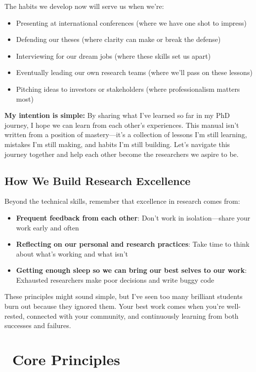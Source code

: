 \documentclass[11pt,a4paper]{article}
\newcommand{\staritem}{\item[\color{goldenyellow}\faStar]}
\begin{document}
The habits we develop now will serve us when we're:
\begin{itemize}
    \staritem Presenting at international conferences (where we have one shot to impress)
    \staritem Defending our theses (where clarity can make or break the defense)
    \staritem Interviewing for our dream jobs (where these skills set us apart)
    \staritem Eventually leading our own research teams (where we'll pass on these lessons)
    \staritem Pitching ideas to investors or stakeholders (where professionalism matters most)
\end{itemize}

\textbf{My intention is simple:} By sharing what I've learned so far in my PhD journey, I hope we can learn from each other's experiences. This manual isn't written from a position of mastery—it's a collection of lessons I'm still learning, mistakes I'm still making, and habits I'm still building. Let's navigate this journey together and help each other become the researchers we aspire to be.

\subsection{How We Build Research Excellence}

Beyond the technical skills, remember that excellence in research comes from:
\begin{itemize}
    \item \textbf{Frequent feedback from each other}: Don't work in isolation—share your work early and often
    \item \textbf{Reflecting on our personal and research practices}: Take time to think about what's working and what isn't
    \item \colorbox{yellow!30}{\textbf{Getting enough sleep so we can bring our best selves to our work}:} \newline \colorbox{yellow!30}{Exhausted researchers make poor decisions and write buggy code}
\end{itemize}

These principles might sound simple, but I've seen too many brilliant students burn out because they ignored them. Your best work comes when you're well-rested, connected with your community, and continuously learning from both successes and failures.

\section{\faGem~Core Principles}
\end{document}
